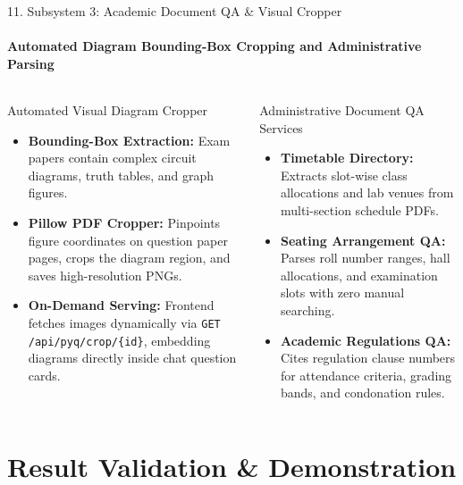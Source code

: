 \documentclass[aspectratio=169, 11pt]{beamer}
\begin{document}
\begin{frame}{11. Subsystem 3: Academic Document QA \& Visual Cropper}
    \framesubtitle{Automated Diagram Bounding-Box Cropping and Administrative Parsing}
    \begin{columns}[T]
        \begin{block}{Automated Visual Diagram Cropper}
            \footnotesize
            \begin{itemize}
                \item \textbf{Bounding-Box Extraction:} Exam papers contain complex circuit diagrams, truth tables, and graph figures.
                \item \textbf{Pillow PDF Cropper:} Pinpoints figure coordinates on question paper pages, crops the diagram region, and saves high-resolution PNGs.
                \item \textbf{On-Demand Serving:} Frontend fetches images dynamically via \texttt{GET /api/pyq/crop/\{id\}}, embedding diagrams directly inside chat question cards.
            \end{itemize}
        \end{block}

        \begin{block}{Administrative Document QA Services}
            \footnotesize
            \begin{itemize}
                \item \textbf{Timetable Directory:} Extracts slot-wise class allocations and lab venues from multi-section schedule PDFs.
                \item \textbf{Seating Arrangement QA:} Parses roll number ranges, hall allocations, and examination slots with zero manual searching.
                \item \textbf{Academic Regulations QA:} Cites regulation clause numbers for attendance criteria, grading bands, and condonation rules.
            \end{itemize}
        \end{block}
    \end{columns}
\end{frame}

\section{Result Validation \& Demonstration}
\end{document}

